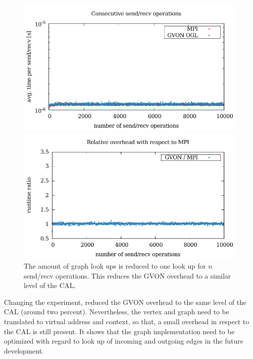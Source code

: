 \begin{figure}[H]
  \begin{minipage}[t]{0.5\textwidth} 
    \includegraphics[width=\textwidth]{plots/50_nsend_one_lookup_laser}
  \end{minipage}%
  \begin{minipage}[t]{0.5\textwidth}
    \includegraphics[width=\textwidth]{plots/50_nsend_one_lookup_overhead_gvon_laser}
  \end{minipage}%
  \caption{The amount of graph look ups is reduced to one look up for
    $n$ send/recv operations.  This reduces the GVON overhead to
    a similar level of the CAL.}
  \label{fig:nsend_one_lookup_kepler}
\end{figure}

\noindent Changing the experiment, reduced the GVON overhead to the
same level of the CAL (around two percent). Nevertheless, the vertex and
graph need to be translated to virtual address and context, so that, a
small overhead in respect to the CAL is still present. It shows that
the graph implementation need to be optimized with regard to look up
of incoming and outgoing edges in the future development.

